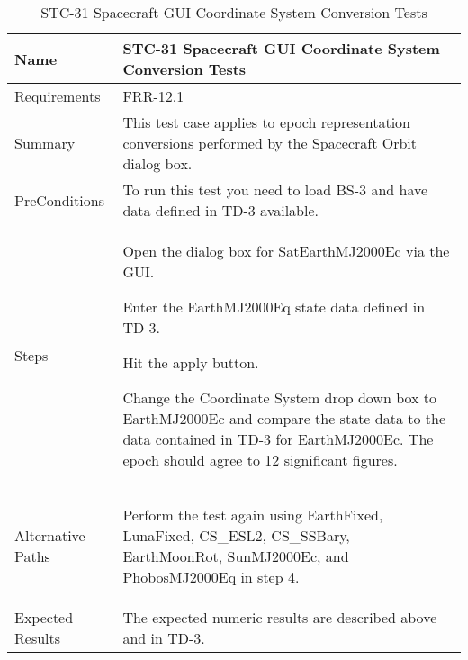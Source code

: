 
\begin{table}[htbp!]
\centering
      \begin{tabular}{|p{1.05 in} |p{4.75 in} |}
      \hline
         \rowcolor[rgb]{0.8,0.8,0.8} Name & STC-31 Spacecraft GUI Coordinate System Conversion Tests\\
         \hline
         Requirements & FRR-12.1\\ \hline
         Summary &
         This test case applies to epoch representation conversions performed by the Spacecraft Orbit dialog box.  \\
         \hline
         PreConditions & To run this test you need to load BS-3 and have data defined in TD-3 available.\\
         \hline
         Steps &
         \begin{compactenum}
         \item Open the dialog box for SatEarthMJ2000Ec via the GUI.
         \item Enter the EarthMJ2000Eq state data defined in TD-3.
         \item Hit the apply button.
         \item Change the Coordinate System drop down box to EarthMJ2000Ec and compare the state data to 
               the data contained in TD-3 for EarthMJ2000Ec. The epoch should agree to 12 significant
               figures.
         \end{compactenum}\\
		 \hline
         Alternative Paths &
         \begin{compactenum}
         \item Perform the test again using EarthFixed, LunaFixed, CS\_ESL2, CS\_SSBary, EarthMoonRot, SunMJ2000Ec, and PhobosMJ2000Eq in step 4.
         \end{compactenum}\\
         \hline
         Expected Results & The expected numeric results are described above and in TD-3.\\
      \hline
\end{tabular}
      \label{Table:STC-31}
      \caption{STC-31 Spacecraft GUI Coordinate System Conversion Tests}
\end{table} 